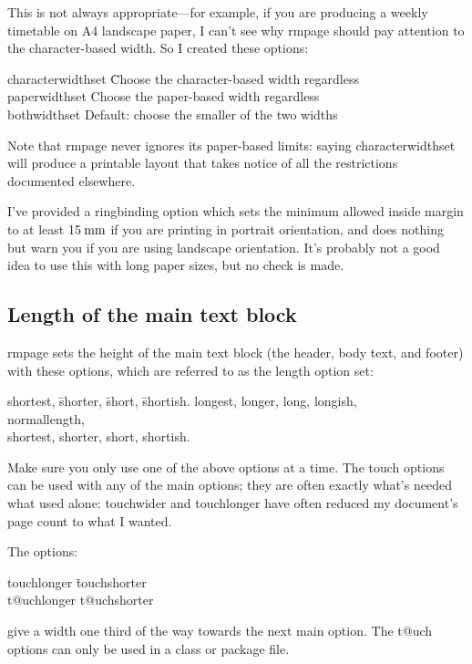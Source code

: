 \documentclass[11pt,loose,twoside,touchwider,longish,
                      noheaders,a4paper,notstdmargins]{report}
\makeatletter
\newcommand*{\unit}[1]{\ifmmode\@unit{\hbox{#1}}\else$\@unit{\hbox{#1}}$\fi}%
\let\units=\unit
\def\@unit#1{{\setbox0=\hbox{#1}\ifdim\wd0<1.125em\,\else\>\fi\box0}}
\newcommand*{\classname}[1]{{\ttfamily #1}}
\newcommand*{\optname}[1]{{\ttfamily #1}}
\newcommand*{\rmpage}{\classname{rmpage}\xspace}
\makeatother
\begin{document}
This is not always appropriate---for example, if you are producing
a weekly timetable on A4 landscape paper, I can't see why
\rmpage should pay attention to the character-based width.  So I
created these options:
\begin{tabbing}
\optname{characterwidthset} \= Choose the character-based width
regardless \\
\optname{paperwidthset} \> Choose the paper-based width regardless \\
\optname{bothwidthset} \> Default: choose the smaller of the two
widths\\
\end{tabbing}

Note that \rmpage never ignores its paper-based limits: saying
\optname{characterwidthset} will produce a printable layout that takes
notice of all the restrictions documented elsewhere.

I've provided a \optname{ringbinding} option which sets the minimum
allowed inside margin to at least 15\units{mm} if you are printing in
portrait orientation, and does nothing but warn you if you are using
landscape orientation.  It's probably not a good idea to use this with
long paper sizes, but no check is made.

\subsection{Length of the main text block}
\label{use:length}

\rmpage sets the height  of the main text block (the header, body text,
and footer) with these options, which are referred to as the length
option set:
\begin{tabbing}
\optname{shortest}, \= \optname{shorter}, \= \optname{short}, \=
\optname{shortish}.\kill
\optname{longest}, \> \optname{longer}, \> \optname{long}, \>
\optname{longish}, \\
\optname{normallength},\\
\optname{shortest}, \> \optname{shorter}, \> \optname{short}, \>
\optname{shortish}.
\end{tabbing}
Make sure you only use one of the above options at a time.  The
\optname{touch} options can be used with any of the main options; they
are often exactly what's needed what used alone: \optname{touchwider}
and \optname{touchlonger} have often reduced my document's
page count to what I wanted.

The options:
\begin{tabbing}
\optname{touchlonger} \= \optname{touchshorter} \\
\optname{t@uchlonger} \> \optname{t@uchshorter}
\end{tabbing}
give a width one third of the way towards the next main option.  The
\optname{t@uch} options can only be used in a class or package file.
\end{document}
